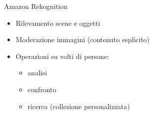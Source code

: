 %
\begin{frame}[t]{Amazon Rekognition}
\begin{itemize}
	\item Rilevamento scene e oggetti
	\item Moderazione immagini (contenuto esplicito)
	\item Operazioni su volti di persone:
	\begin{itemize}
		\item analisi
		\item confronto
		\item ricerca (collezione personalizzata)
	\end{itemize}
\end{itemize}
\end{frame}
%
